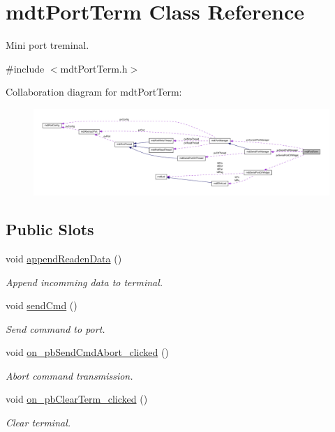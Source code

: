 \hypertarget{classmdt_port_term}{
\section{mdtPortTerm Class Reference}
\label{classmdt_port_term}
}


Mini port treminal.  




{\ttfamily \#include $<$mdtPortTerm.h$>$}



Collaboration diagram for mdtPortTerm:\nopagebreak
\begin{figure}[H]
\begin{center}
\leavevmode
\includegraphics[width=400pt]{classmdt_port_term__coll__graph}
\end{center}
\end{figure}
\subsection*{Public Slots}
\begin{DoxyCompactItemize}
\item 
void \hyperlink{classmdt_port_term_a5bd2b5e6c19c2c4b612f84763bb9ed6f}{appendReadenData} ()
\begin{DoxyCompactList}\small\item\em Append incomming data to terminal. \end{DoxyCompactList}\item 
void \hyperlink{classmdt_port_term_a7ec568c44f862fe7aee83f1a271ac6bb}{sendCmd} ()
\begin{DoxyCompactList}\small\item\em Send command to port. \end{DoxyCompactList}\item 
\hypertarget{classmdt_port_term_a1b232e686b401d7103eb1c682be330a9}{
void \hyperlink{classmdt_port_term_a1b232e686b401d7103eb1c682be330a9}{on\_\-pbSendCmdAbort\_\-clicked} ()}
\label{classmdt_port_term_a1b232e686b401d7103eb1c682be330a9}

\begin{DoxyCompactList}\small\item\em Abort command transmission. \end{DoxyCompactList}\item 
\hypertarget{classmdt_port_term_abb3fc55837782dbea240b069a48b18ce}{
void \hyperlink{classmdt_port_term_abb3fc55837782dbea240b069a48b18ce}{on\_\-pbClearTerm\_\-clicked} ()}
\label{classmdt_port_term_abb3fc55837782dbea240b069a48b18ce}

\begin{DoxyCompactList}\small\item\em Clear terminal. \end{DoxyCompactList}\end{DoxyCompactItemize}
